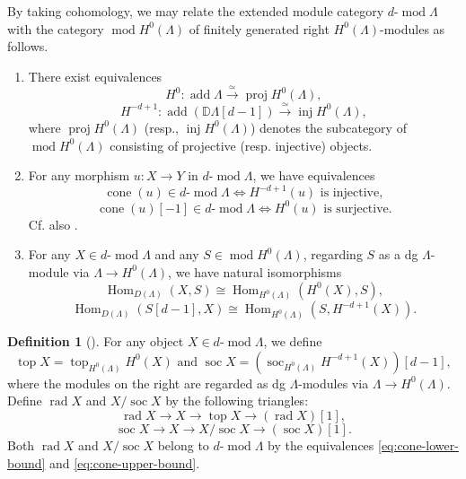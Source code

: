 \documentclass[11pt,a4paper,reqno]{amsart}
\theoremstyle{plain}
\numberwithin{equation}{section}
\theoremstyle{definition}
\newtheorem{definition}[theorem]{Definition}
\providecommand{\add}{\operatorname{add}}
\renewcommand{\mod}{\operatorname{mod}}
\newcommand{\Hom}{\operatorname{Hom}}
\newcommand{\emod}[2]{#1\text{-}\!\mod #2}
\begin{document}
By taking cohomology, we may relate the extended module category $\emod{d}{\Lambda}$ with the category $\mod H^0(\Lambda)$ of finitely generated right $H^0(\Lambda)$-modules as follows.
\begin{enumerate}
  \item There exist equivalences
    \begin{equation}\label{eq:proj-equiv}
        H^0:\add\Lambda\xrightarrow{\simeq}\operatorname{proj}H^0(\Lambda),
    \end{equation}
    \begin{equation}\label{eq:inj-equiv}
        H^{-d+1}:\add(\mathbb D\Lambda[d-1])\xrightarrow{\simeq}\operatorname{inj}H^0(\Lambda),
    \end{equation}
    where $\operatorname{proj}H^0(\Lambda)$ (resp., $\operatorname{inj}H^0(\Lambda)$) denotes the subcategory of $\mod H^0(\Lambda)$ consisting of projective (resp. injective) objects.
  \item For any morphism $u:X\to Y$ in $\emod{d}{\Lambda}$, we have equivalences
  \begin{equation}\label{eq:cone-lower-bound}
    \operatorname{cone}(u)\in\emod{d}{\Lambda} \iff H^{-d+1}(u)\text{ is injective},  
  \end{equation}
  \begin{equation}\label{eq:cone-upper-bound}
      \operatorname{cone}(u)[-1]\in\emod{d}{\Lambda} \iff H^0(u)\text{ is surjective}.
  \end{equation}
Cf. also \cite[Remark~1.1]{MP}.
  \item For any $X\in\emod{d}{\Lambda}$ and any $S\in\mod H^0(\Lambda)$, regarding $S$ as a dg $\Lambda$-module via $\Lambda\to H^0(\Lambda)$, we have natural isomorphisms
  \begin{equation}\label{eq:simple-top-Hom}
      \Hom_{D(\Lambda)}(X,S)\cong\Hom_{H^0(\Lambda)}(H^0(X),S),
  \end{equation}
  \begin{equation}\label{eq:simple-socle-Hom}
      \Hom_{D(\Lambda)}(S[d-1],X)\cong\Hom_{H^0(\Lambda)}(S,H^{-d+1}(X)).
  \end{equation}
\end{enumerate}

\begin{definition}[{\cite[Definition~3.6]{MP}}]\label{def:rad-soc}
For any object $X\in\emod{d}{\Lambda}$, we define
\[
 \operatorname{top}X=\operatorname{top}_{H^0(\Lambda)}H^0(X) \text{ and } \operatorname{soc}X=\left(\operatorname{soc}_{H^0(\Lambda)}H^{-d+1}(X)\right)[d-1],
\]
where the modules on the right are regarded as dg $\Lambda$-modules via $\Lambda\to H^0(\Lambda)$. Define $\operatorname{rad}X$ and $X/\operatorname{soc}X$ by the following triangles:
\[
\operatorname{rad}X\to X\to\operatorname{top}X\to(\operatorname{rad}X)[1],
\]
\[
\operatorname{soc}X\to X\to X/\operatorname{soc}X\to(\operatorname{soc}X)[1].
\]
Both $\operatorname{rad}X$ and $X/\operatorname{soc}X$ belong to $\emod{d}{\Lambda}$ by the equivalences \eqref{eq:cone-lower-bound} and \eqref{eq:cone-upper-bound}.
\end{definition}
\end{document}
